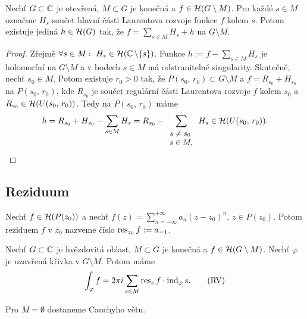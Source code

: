 \begin{theorem}
Nechť $G \subset \operatorname{\mathbb{C}} $ je otevřená, $M \subset G$ je konečná a $f \in \operatorname{\mathcal{H}} (G \setminus M)$. Pro každé $s \in M$ označme $H_s$ součet hlavní části Laurentova rozvoje funkce $f$ kolem $s$. Potom existuje jediná $h \in \operatorname{\mathcal{H}} (G)$ tak, že $f=\sum\limits_{s\in M} H_s+h$ na $G \setminus M$.
\end{theorem}
\begin{proof}
Zřejmě $\forall s \in M:\ H_s \in \Holo (\Comp  \setminus \{s \})$. Funkce $h:=f-\sum\limits_{s\in M} H_s$ je holomorfní na $G \setminus M$ a v bodech $s \in M$ má odstranitelné singularity. Skutečně, nechť $s_0 \in M$. Potom existuje $r_0>0$ tak, že $P(s_0,\,r_0) \subset G \setminus M$ a $f=R_{s_0}+H_{s_0}$ na $P(s_0,\,r_0)$, kde $R_{s_0}$ je součet regulární části Laurentova rozvoje $f$ kolem $s_0$ a $R_{s_0}\in \operatorname{\mathcal{H}} (U(s_0,\,r_0))$. Tedy na $P(s_0,\,r_0)$ máme
$$h=R_{s_0}+H_{s_0}-\sum\limits_{s\in M} H_s=R_{s_0}-\sum\limits_{
\small{\begin{array}l
s \neq s_0\\
s\in M,
\end{array}}}
H_s \in \Holo (U(s_0,\,r_0)).$$
\end{proof}

\subsection{Reziduum}
\begin{definition}
Nechť $f \in \operatorname{\mathcal{H}} (P(z_0))$ a nechť $f(z)=\sum\limits_{n=-\infty}^{+\infty}a_n(z-z_0)^n$, $z\in P(z_0)$. Potom reziduem $f$ v $z_0$ nazveme číslo $\operatorname{res}_{z_0}f:=a_{-1}$.
\end{definition}

\begin{theorem}
Nechť $G \subset \operatorname{\mathbb{C}} $ je hvězdovitá oblast, $M \subset G$ je konečná a $f \in \operatorname{\mathcal{H}} (G \setminus M)$. Nechť $\varphi$ je uzavřená křivka v $G \setminus M$. Potom máme 
\begin{equation}
    \int_\varphi f=2\pi i \sum\limits_{s\in M}\operatorname{res}_sf \cdot \operatorname{ind}_\varphi s.
    \tag{RV}
    \label{eqn:7.31.RV}
\end{equation}
\end{theorem}

\begin{note*}
Pro $M=\emptyset$ dostaneme Cauchyho větu.
\end{note*}

